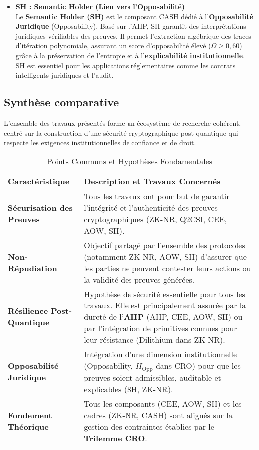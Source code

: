 \documentclass[11pt]{article}
\begin{document}
\begin{itemize}
    \item \textbf{SH : Semantic Holder (Lien vers l'Opposabilité)} \\
    Le \textbf{Semantic Holder (SH)} est le composant CASH dédié à l'\textbf{Opposabilité Juridique} (Opposability). Basé sur l'AIIP, SH garantit des interprétations juridiques vérifiables des preuves. Il permet l'extraction algébrique des traces d'itération polynomiale, assurant un score d'opposabilité élevé ($\Omega \geq 0,60$) grâce à la préservation de l'entropie et à l'\textbf{explicabilité institutionnelle}. SH est essentiel pour les applications réglementaires comme les contrats intelligents juridiques et l'audit.

\end{itemize}



\subsection{ Synthèse comparative}

L'ensemble des travaux présentés forme un écosystème de recherche cohérent, centré sur la construction d'une sécurité cryptographique post-quantique qui respecte les exigences institutionnelles de confiance et de droit.

\begin{table}[H]
\centering
\caption{Points Communs et Hypothèses Fondamentales}

\renewcommand{\arraystretch}{1.2} %
\begin{tabular}{>{\centering\arraybackslash}m{3.5cm} | >{\raggedright\arraybackslash}m{11cm}}
\toprule
\textbf{Caractéristique} & \textbf{Description et Travaux Concernés} \\
\midrule
\textbf{Sécurisation des Preuves} & Tous les travaux ont pour but de garantir l'intégrité et l'authenticité des preuves cryptographiques (ZK-NR, Q2CSI, CEE, AOW, SH). \\
\midrule
\textbf{Non-Répudiation} & Objectif partagé par l'ensemble des protocoles (notamment ZK-NR, AOW, SH) d'assurer que les parties ne peuvent contester leurs actions ou la validité des preuves générées. \\
\midrule
\textbf{Résilience Post-Quantique} & Hypothèse de sécurité essentielle pour tous les travaux. Elle est principalement assurée par la dureté de l'\textbf{AIIP} (AIIP, CEE, AOW, SH) ou par l'intégration de primitives connues pour leur résistance (Dilithium dans ZK-NR). \\
\midrule
\textbf{Opposabilité Juridique} & Intégration d'une dimension institutionnelle (Opposability, $H_{\text{Opp}}$ dans CRO) pour que les preuves soient admissibles, auditable et explicables (SH, ZK-NR). \\
\midrule
\textbf{Fondement Théorique} & Tous les composants (CEE, AOW, SH) et les cadres (ZK-NR, CASH) sont alignés sur la gestion des contraintes établies par le \textbf{Trilemme CRO}. \\
\bottomrule
\end{tabular}
\end{table}
\end{document}
